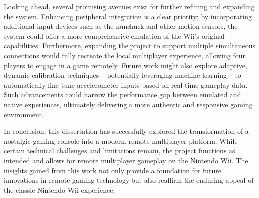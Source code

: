 
Looking ahead, several promising avenues exist for further refining and
expanding the system. Enhancing peripheral integration is a clear priority; by
incorporating additional input devices such as the nunchuck and other motion
sensors, the system could offer a more comprehensive emulation of the Wii’s
original capabilities. Furthermore, expanding the project to support multiple
simultaneous connections would fully recreate the local multiplayer experience,
allowing four players to engage in a game remotely. Future work might also
explore adaptive, dynamic calibration techniques -- potentially leveraging
machine learning -- to automatically fine-tune accelerometer inputs based on
real-time gameplay data.  Such advancements could narrow the performance gap
between emulated and native experiences, ultimately delivering a more authentic
and responsive gaming environment.

In conclusion, this dissertation has successfully explored the transformation of
a nostalgic gaming console into a modern, remote multiplayer platform.  While
certain technical challenges and limitations remain, the project functions as intended and allows for remote
multiplayer gameplay on the Nintendo Wii. The
insights gained from this work not only provide a foundation for future
innovations in remote gaming technology but also reaffirm the enduring appeal of
the classic Nintendo Wii experience.
